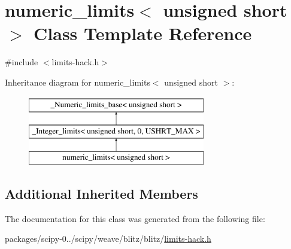 \hypertarget{classnumeric__limits_3_01unsigned_01short_01_4}{}\section{numeric\+\_\+limits$<$ unsigned short $>$ Class Template Reference}
\label{classnumeric__limits_3_01unsigned_01short_01_4}


{\ttfamily \#include $<$limits-\/hack.\+h$>$}

Inheritance diagram for numeric\+\_\+limits$<$ unsigned short $>$\+:\begin{figure}[H]
\begin{center}
\leavevmode
\includegraphics[height=3.000000cm]{classnumeric__limits_3_01unsigned_01short_01_4}
\end{center}
\end{figure}
\subsection*{Additional Inherited Members}


The documentation for this class was generated from the following file\+:\begin{DoxyCompactItemize}
\item 
packages/scipy-\/0../scipy/weave/blitz/blitz/\hyperlink{limits-hack_8h}{limits-\/hack.\+h}\end{DoxyCompactItemize}

